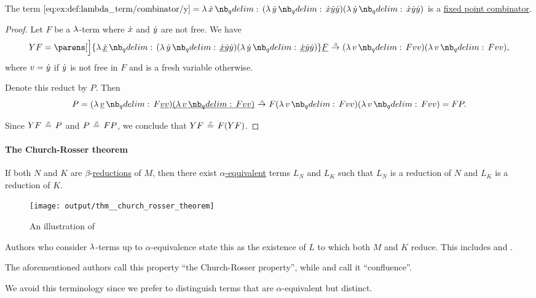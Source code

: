 \begin{proposition}\label{thm:y_is_a_fixed_point_combinator}
  The term \( \ref{eq:ex:def:lambda_term/combinator/y} = \qabs \synx (\qabs \syny \synx \syny \syny) (\qabs \syny \synx \syny \syny) \) is a \hyperref[def:fixed_point_combinator]{fixed point combinator}.
\end{proposition}
\begin{proof}
  Let \( F \) be a \( \mathrm{\lambda} \)-term where \( {\dot{x}} \) and \( {\dot{y}} \) are not free. We have
  \begin{equation*}
    YF
    =
    \parens[\Big]{ \qabs {\hi{\synx}} (\qabs \syny \hi{\synx} \syny \syny) (\qabs \syny \hi{\synx} \syny \syny) } \hi{F}
    \bred
    (\qabs v F v v) (\qabs v F v v),
  \end{equation*}
  where \( v = {\dot{y}} \) if \( {\dot{y}} \) is not free in \( F \) and is a fresh variable otherwise.

  Denote this reduct by \( P \). Then
  \begin{equation*}
    P =
    (\qabs {\hi{v}} F \hi{v} \hi{v}) \hi{(\qabs v F v v)}
    \bred
    F (\qabs v F v v) (\qabs v F v v)
    =
    FP.
  \end{equation*}

  Since \( YF \bequiv P \) and \( P \bequiv FP \), we conclude that \( YF \bequiv F(YF) \).
\end{proof}

\paragraph{The Church-Rosser theorem}

\begin{theorem}\label{thm:church_rosser_theorem}
  If both \( N \) and \( K \) are \( \beta \)-\hyperref[def:beta_eta_reduction]{reductions} of \( M \), then there exist \hyperref[def:lambda_term_alpha_equivalence]{\( \alpha \)-equivalent} terms \( L_N \) and \( L_K \) such that \( L_N \) is a reduction of \( N \) and \( L_K \) is a reduction of \( K \).

  \begin{figure}[!ht]
    \centering
    \texttt{[image: output/thm\_\_church\_rosser\_theorem]}
    \caption{An illustration of }\label{fig:thm:church_rosser_theorem}
  \end{figure}
\end{theorem}
\begin{comments}
  \item Authors who consider \( \mathrm{\lambda} \)-terms up to \( \alpha \)-equivalence state this as the existence of \( L \) to which both \( M \) and \( K \) reduce. This includes \cite[ch. 3]{Barendregt1984} and \cite[1B5]{Hindley1997}.

  The aforementioned authors call this property \enquote{the Church-Rosser property}, while  and  call it \enquote{confluence}.

  We avoid this terminology since we prefer to distinguish terms that are \( \alpha \)-equivalent but distinct.
\end{comments}
